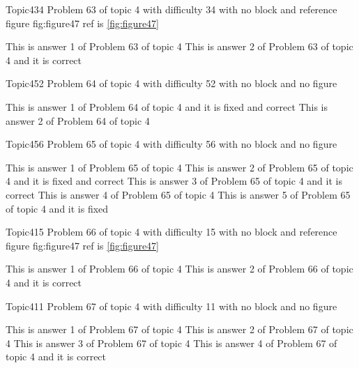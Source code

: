 \documentclass[master]{exam}
\begin{document}
\begin{problem}{Topic4}{34}
	Problem 63 of topic 4 with difficulty 34 with no block and reference figure fig:figure47 ref is \ref{fig:figure47}
	\begin{answers}
		\answer This is answer 1 of Problem 63 of topic 4 
		\answer[correct] This is answer 2 of Problem 63 of topic 4 and it is correct
	\end{answers}
\end{problem}

\begin{problem}{Topic4}{52}
	Problem 64 of topic 4 with difficulty 52 with no block and no figure
	\begin{answers}
		 This is answer 1 of Problem 64 of topic 4 and it is fixed and correct
		\answer This is answer 2 of Problem 64 of topic 4 
	\end{answers}
\end{problem}

\begin{problem}{Topic4}{56}
	Problem 65 of topic 4 with difficulty 56 with no block and no figure
	\begin{answers}
		\answer This is answer 1 of Problem 65 of topic 4 
		 This is answer 2 of Problem 65 of topic 4 and it is fixed and correct
		\answer[correct] This is answer 3 of Problem 65 of topic 4 and it is correct
		\answer This is answer 4 of Problem 65 of topic 4 
		\answer[fixed] This is answer 5 of Problem 65 of topic 4 and it is fixed
	\end{answers}
\end{problem}

\begin{problem}{Topic4}{15}
	Problem 66 of topic 4 with difficulty 15 with no block and reference figure fig:figure47 ref is \ref{fig:figure47}
	\begin{answers}
		\answer This is answer 1 of Problem 66 of topic 4 
		\answer[correct] This is answer 2 of Problem 66 of topic 4 and it is correct
	\end{answers}
\end{problem}

\begin{problem}{Topic4}{11}
	Problem 67 of topic 4 with difficulty 11 with no block and no figure
	\begin{answers}
		\answer This is answer 1 of Problem 67 of topic 4 
		\answer This is answer 2 of Problem 67 of topic 4 
		\answer This is answer 3 of Problem 67 of topic 4 
		\answer[correct] This is answer 4 of Problem 67 of topic 4 and it is correct
	\end{answers}
\end{problem}
\end{document}
